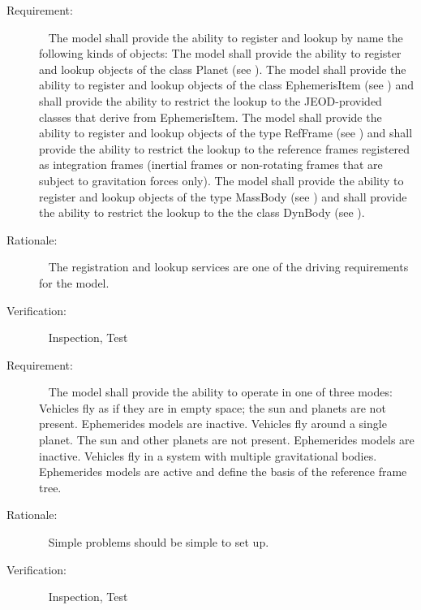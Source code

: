 \label{reqt:lists}
\begin{description}
\item[Requirement:]\ \newline
  The model shall provide the ability to register and lookup by name
  the following kinds of objects:
  \label{reqt:planet_list}
  The model shall provide the ability to register and lookup objects
  of the class Planet
  (see ).
  \label{reqt:ephem_item_list}
  The model shall provide the ability to register and lookup objects
  of the class EphemerisItem
  (see )
  and shall provide the ability to restrict the lookup to the
  JEOD-provided classes that derive from EphemerisItem. 
  \label{reqt:ref_frame_list}
  The model shall provide the ability to register and lookup objects
  of the type RefFrame
  (see )
  and shall provide the ability to restrict the lookup to the
  reference frames registered as integration frames
  (inertial frames or non-rotating frames that are subject to gravitation
  forces only).
  \label{reqt:mass_body_list}
  The model shall provide the ability to register and lookup objects
  of the type MassBody
  (see )
  and shall provide the ability to restrict the lookup to the
  the class DynBody
  (see ).
\item[Rationale:]\ \newline
  The registration and lookup services are one of the driving
  requirements for the model.
\item[Verification:]\ \newline
  Inspection, Test
\end{description}


\label{reqt:mode}
\begin{description}
\item[Requirement:]\ \newline
  The model shall provide the ability to operate in one of three modes:
  \label{reqt:empty_space_mode}
  Vehicles fly as if they are in empty space; the sun and planets are not
  present. Ephemerides models are inactive.
  \label{reqt:single_planet_mode}
  Vehicles fly around a single planet. The sun and other planets are not
  present. Ephemerides models are inactive.
  \label{reqt:ephemeris_mode}
  Vehicles fly in a system with multiple gravitational bodies.
  Ephemerides models are active and define the basis of the reference
  frame tree.
\item[Rationale:]\ \newline
  Simple problems should be simple to set up.
\item[Verification:]\ \newline
  Inspection, Test
\end{description}

